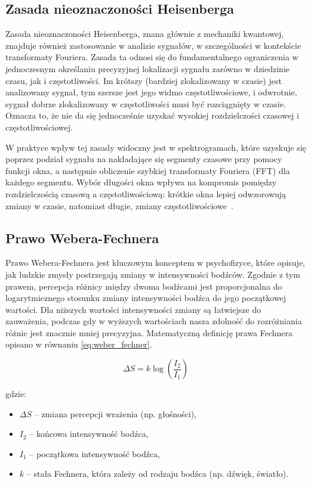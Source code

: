 \documentclass{SGGW-thesis}
\begin{document}
\subsection{Zasada nieoznaczoności Heisenberga}

Zasada nieoznaczoności Heisenberga, znana głównie z mechaniki kwantowej, znajduje również zastosowanie w analizie sygnałów, w szczególności w kontekście transformaty Fouriera. Zasada ta odnosi się do fundamentalnego ograniczenia w jednoczesnym określaniu precyzyjnej lokalizacji sygnału zarówno w dziedzinie czasu, jak i częstotliwości. Im krótszy (bardziej zlokalizowany w czasie) jest analizowany sygnał, tym szersze jest jego widmo częstotliwościowe, i odwrotnie, sygnał dobrze zlokalizowany w częstotliwości musi być rozciągnięty w czasie. Oznacza to, że nie da się jednocześnie uzyskać wysokiej rozdzielczości czasowej i częstotliwościowej. 

W praktyce wpływ tej zasady widoczny jest w spektrogramach, które uzyskuje się poprzez podział sygnału na nakładające się segmenty czasowe przy pomocy funkcji okna, a następnie obliczenie szybkiej transformaty Fouriera (FFT) dla każdego segmentu. Wybór długości okna wpływa na kompromis pomiędzy rozdzielczością czasową a częstotliwościową: krótkie okna lepiej odwzorowują zmiany w czasie, natomiast długie, zmiany częstotliwościowe~\cite{bracewell2000fourier}.

\subsection{Prawo Webera-Fechnera}

Prawo Webera-Fechnera jest kluczowym konceptem w psychofizyce, które opisuje, jak ludzkie zmysły postrzegają zmiany w intensywności bodźców. Zgodnie z tym prawem, percepcja różnicy między dwoma bodźcami jest proporcjonalna do logarytmicznego stosunku zmiany intensywności bodźca do jego początkowej wartości. Dla niższych wartości intensywności zmiany są łatwiejsze do zauważenia, podczas gdy w wyższych wartościach nasza zdolność do rozróżniania różnic jest znacznie mniej precyzyjna. Matematyczną definicję prawa Fechnera opisano w równaniu \ref{eq:weber_fechner}.

\begin{equation}
    \Delta S = k \log\left(\frac{I_2}{I_1}\right)
    \label{eq:weber_fechner}
\end{equation}

gdzie:
\begin{itemize}
    \renewcommand{\labelitemi}{}
    \item \( \Delta S \) – zmiana percepcji wrażenia (np. głośności),
    \item \( I_2 \) – końcowa intensywność bodźca,
    \item \( I_1 \) – początkowa intensywność bodźca,
    \item \( k \) – stała Fechnera, która zależy od rodzaju bodźca (np. dźwięk, światło).
\end{itemize}
\end{document}
